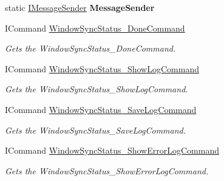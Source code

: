 \begin{DoxyCompactItemize}
\item 
\hypertarget{class_cloud_api_public_1_1_event_message_receiver_1_1_event_message_receiver_a3bf33686da629dae4091e5bf9159e7c6}{static \hyperlink{interface_cloud_api_public_1_1_model_1_1_i_message_sender}{I\-Message\-Sender} {\bfseries Message\-Sender}}\label{class_cloud_api_public_1_1_event_message_receiver_1_1_event_message_receiver_a3bf33686da629dae4091e5bf9159e7c6}

\item 
I\-Command \hyperlink{class_cloud_api_public_1_1_event_message_receiver_1_1_event_message_receiver_a464b93353f7142bb7290f357b059c511}{Window\-Sync\-Status\-\_\-\-Done\-Command}
\begin{DoxyCompactList}\small\item\em Gets the Window\-Sync\-Status\-\_\-\-Done\-Command. \end{DoxyCompactList}\item 
I\-Command \hyperlink{class_cloud_api_public_1_1_event_message_receiver_1_1_event_message_receiver_a2d3561dbc21714c80eaa066e98fcb0dd}{Window\-Sync\-Status\-\_\-\-Show\-Log\-Command}
\begin{DoxyCompactList}\small\item\em Gets the Window\-Sync\-Status\-\_\-\-Show\-Log\-Command. \end{DoxyCompactList}\item 
I\-Command \hyperlink{class_cloud_api_public_1_1_event_message_receiver_1_1_event_message_receiver_aa5c08bb579f16c242941aaded7def336}{Window\-Sync\-Status\-\_\-\-Save\-Log\-Command}
\begin{DoxyCompactList}\small\item\em Gets the Window\-Sync\-Status\-\_\-\-Save\-Log\-Command. \end{DoxyCompactList}\item 
I\-Command \hyperlink{class_cloud_api_public_1_1_event_message_receiver_1_1_event_message_receiver_a728ae5e0cd9ddbe10a21e79ecec3f464}{Window\-Sync\-Status\-\_\-\-Show\-Error\-Log\-Command}
\begin{DoxyCompactList}\small\item\em Gets the Window\-Sync\-Status\-\_\-\-Show\-Error\-Log\-Command. \end{DoxyCompactList}\end{DoxyCompactItemize}


